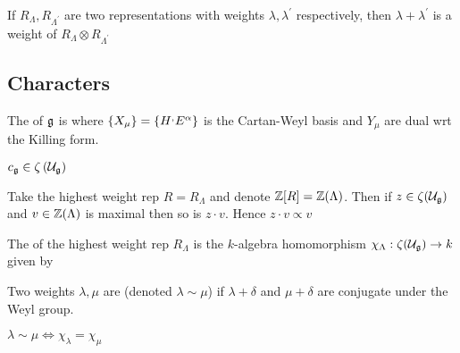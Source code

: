 \documentclass{article}
\begin{document}
\begin{lemma}
	If $R_\Lambda, R_{\Lambda^\prime}$ are two representations with weights $\lambda,\lambda^\prime$ respectively, then $\lambda+\lambda^\prime$ is a weight of $R_\Lambda \otimes R_{\Lambda^\prime}$
\end{lemma}

\subsection{Characters}

\begin{definition}
	The  of $\mathfrak{g}$ is 
where $\left\{ X_\mu \right\} = \left\{ H^, E^\alpha \right\}$ is the Cartan-Weyl basis and $Y_\mu$ are dual wrt the Killing form. 
\end{definition}

\begin{lemma}
	$c_{\mathfrak{g}} \in \zeta \left( \mathcal{U}_{\mathfrak{g}} \right)$
\end{lemma}
\begin{lemma}
	Take the highest weight rep $R = R_\Lambda$ and denote $\mathbb{Z}[R] = \mathbb{Z}(\Lambda)$. Then if $z \in \zeta(\mathcal{U}_{\mathfrak{g}})$ and $v \in \mathbb{Z}(\Lambda)$ is maximal then so is $z \cdot v$. Hence $z \cdot v \propto v$
\end{lemma}

\begin{definition}
	The  of the highest weight rep $R_\Lambda$ is the $k$-algebra homomorphism $\chi_\Lambda : \zeta(\mathcal{U}_{\mathfrak{g}}) \to k$ given by 
\end{definition}

\begin{definition}
	Two weights $\lambda,\mu$ are  (denoted $\lambda \sim \mu$) if $\lambda+\delta$ and $\mu+\delta$ are conjugate under the Weyl group.  
\end{definition}

\begin{theorem}
	$\lambda \sim \mu \Leftrightarrow \chi_\lambda = \chi_\mu$
\end{theorem}


\end{document}
